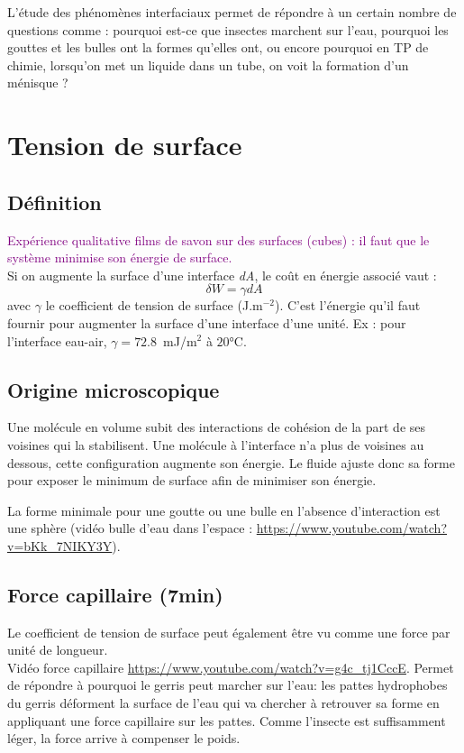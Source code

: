 \documentclass[11pt]{report}
\numberwithin{figure}{section}
\numberwithin{equation}{section}
\numberwithin{table}{section}
\newcommand{\1}{\boldsymbol{1}}
\begin{document}
L'étude des phénomènes interfaciaux permet de répondre à un certain nombre de questions comme : pourquoi est-ce que insectes marchent sur l'eau, pourquoi les gouttes et les bulles ont la formes qu'elles ont, ou encore pourquoi en TP de chimie, lorsqu'on met un liquide dans un tube, on voit la formation d'un ménisque ?
  \section{Tension de surface}
  \subsection{Définition}
  \textcolor{purple}{Expérience qualitative films de savon sur des surfaces (cubes) : il faut que le système minimise son énergie de surface.}\\
  Si on augmente la surface d'une interface \textit{dA}, le coût en énergie associé vaut : 
  \begin{equation}
      \delta W = \gamma dA
  \end{equation}
  avec $\gamma$ le coefficient de tension de surface (J.m$^{-2}$). C'est l'énergie qu'il faut fournir pour augmenter la surface d'une interface d'une unité. Ex : pour l'interface eau-air, $\gamma = 72.8$~mJ/m$^2$ à $20°$C. 
  
  \subsection{Origine microscopique}
  Une molécule en volume subit des interactions de cohésion de la part de ses voisines qui la stabilisent. Une molécule à l'interface n'a plus de voisines au dessous, cette configuration augmente son énergie. Le fluide ajuste donc sa forme pour exposer le minimum de surface afin de minimiser son énergie.

  La forme minimale pour une goutte ou une bulle en l'absence d'interaction est une sphère (vidéo bulle d'eau dans l'espace : \url{https://www.youtube.com/watch?v=bKk_7NIKY3Y}). 
  
  \subsection{Force capillaire (7min)}
  Le coefficient de tension de surface peut également être vu comme une force par unité de longueur. \\
  Vidéo force capillaire \url{https://www.youtube.com/watch?v=g4c_tj1CccE}.
  Permet de répondre à pourquoi le gerris peut marcher sur l'eau: les pattes hydrophobes du gerris déforment la surface de l'eau qui va chercher à retrouver sa forme en appliquant une force capillaire sur les pattes. Comme l'insecte est suffisamment léger, la force arrive à compenser le poids. 
  
\end{document}

